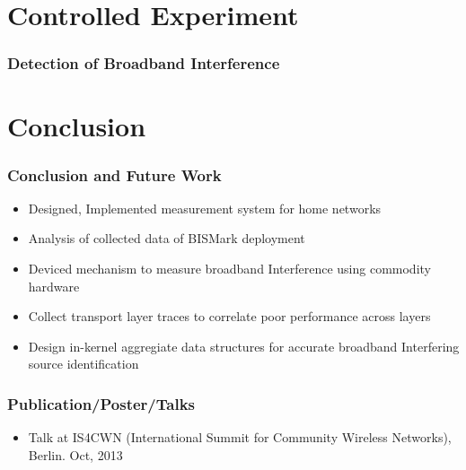 \documentclass{beamer}
\begin{document}
\section{Controlled Experiment}
\begin{frame}
  \frametitle{Detection of Broadband Interference}
\end{frame}


\section{Conclusion}
\begin{frame}
  \frametitle{Conclusion and Future Work} 
    \begin{itemize} 
    \item Designed, Implemented measurement system for home networks        
    \item Analysis of collected data of BISMark deployment
    \item Deviced mechanism to measure broadband Interference using
    commodity hardware
    \item Collect transport layer traces to correlate poor performance
    across layers
    \item Design in-kernel aggregiate data structures for accurate broadband
    Interfering source identification
    \end{itemize}
\end{frame}

\begin{frame}
  \frametitle{Publication/Poster/Talks} 
    \begin{itemize} 
    \item Talk at IS4CWN (International Summit for Community Wireless
      Networks), Berlin. Oct, 2013
    \end{itemize}
\end{frame}
\end{document}

